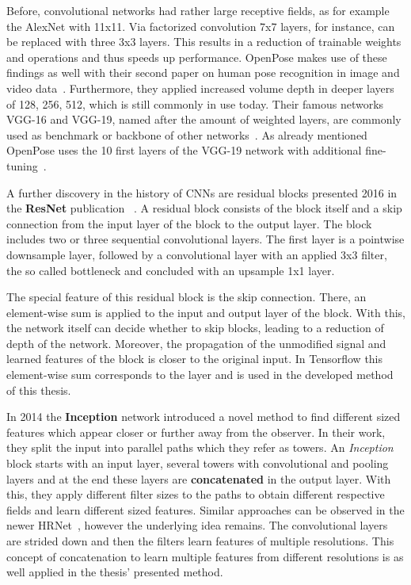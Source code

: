 Before, convolutional networks had rather large receptive fields, as for example the AlexNet with 11x11.
Via factorized convolution 7x7 layers, for instance, can be replaced with three 3x3 layers.
This results in a reduction of trainable weights and operations and thus speeds up performance.
OpenPose makes use of these findings as well with their second paper on human pose recognition in image and video
data~\cite{openpose}.
Furthermore, they applied increased volume depth in deeper layers of 128, 256, 512, which is still commonly in use
today.
Their famous networks VGG-16 and VGG-19, named after the amount of weighted layers, are commonly used as benchmark or
backbone of other networks~\cite{advanceddeeplearningpython}.
As already mentioned OpenPose uses the 10 first layers of the VGG-19 network with additional
fine-tuning~\cite{openpose}.

A further discovery in the history of \glspl{CNN} are residual blocks presented 2016 in the \textbf{ResNet}
publication ~\cite{resnet}.
A residual block consists of the block itself and a skip connection from the input layer of the block to the output
layer.
The block includes two or three sequential convolutional layers. The first layer is a pointwise downsample layer,
followed by a convolutional layer with an applied 3x3 filter, the so called bottleneck and concluded with an upsample 1x1 layer.

The special feature of this residual block is the skip connection.
There, an element-wise sum is applied to the input and
output layer of the block.
With this, the network itself can decide whether to skip blocks, leading to a reduction of depth of the network.
Moreover, the propagation of the unmodified signal and learned features
of the block is closer to the original input.
In Tensorflow this element-wise sum corresponds to the  layer and is used in the developed
method of this thesis.

In 2014 the \textbf{Inception} network introduced a novel method to find different sized features which appear closer or
further away from the observer.
In their work, they split the input into parallel paths which they refer as towers.
An \textit{Inception} block starts with an input layer, several towers with convolutional and pooling layers and at the end
these layers are \textbf{concatenated} in the output layer.
With this, they apply different filter sizes to the paths to obtain different respective fields and learn different sized features.
Similar approaches can be observed in the newer HRNet~\cite{HRNetv2}, however the underlying idea remains.
The convolutional layers are strided down and then the filters learn features of multiple resolutions.
This concept of concatenation to learn multiple features from different resolutions is as well applied in the thesis'
presented method.

